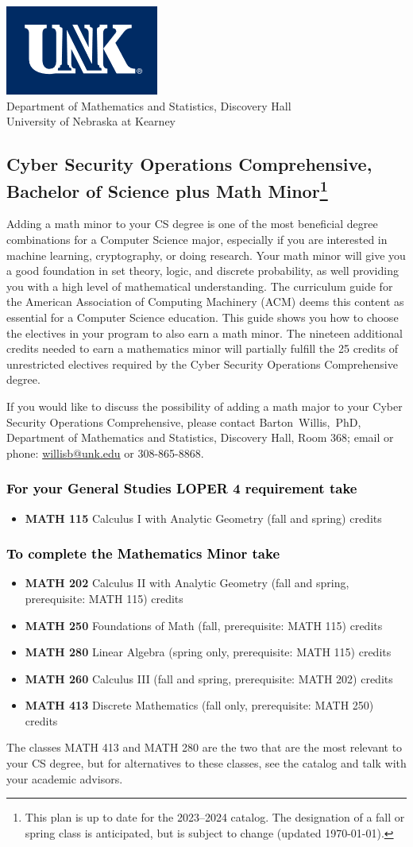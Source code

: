 \documentclass[10pt]{article}
\makeatletter
\newenvironment{mypar}[2]
   {\begin{list}{}%
     {\setlength\leftmargin{#1}
     \setlength\rightmargin{#2}}
     \item[]}
   {\end{list}}
\newcommand{\calcone}{\textbf{MATH 115} Calculus I with Analytic Geometry (fall and spring) \dotfill 5 credits}
\newcommand{\calctwo}{\textbf{MATH 202} Calculus II with Analytic Geometry (fall and spring, prerequisite: MATH 115) \dotfill 5 credits }
\newcommand{\foundations}{\textbf{MATH 250} Foundations of Math (fall, prerequisite: MATH 115)  \dotfill 3 credits}
\newcommand{\calcthree}{\textbf{MATH 260} Calculus III  (fall and spring, prerequisite: MATH 202) \dotfill 5 credits}
\newcommand{\linear}{\textbf{MATH 280} Linear Algebra (spring only, prerequisite: MATH 115) \dotfill 3 credits}
\newcommand{\linearshort}{MATH 280}
\newcommand{\discrete}{\textbf{MATH 413} Discrete Mathematics  (fall only, prerequisite: MATH 250)\dotfill 3 credits}
\newcommand{\discreteshort}{MATH 413}
\newcommand{\contactbw}{\mbox{Barton Willis, PhD}, Department of Mathematics and Statistics,  Discovery Hall, Room 368;
email or phone: \href{mailto:willisb@unk.edu}{willisb@unk.edu} or 308-865-8868.}
\newcommand{\forinfo}[2]{If you would like to discuss the possibility of adding a math {#1} to your {#2}, please contact \contactbw}
\newcommand{\catalog}{2023--2024 }
\newcommand{\LOPER}{LOPER\xspace}
\newcommand{\myfootnote}{\footnote{This plan is up to date for  the \catalog catalog. The designation of a fall or spring class is 
anticipated, but  is subject to change (updated \today).}}
\newcommand{\myheading}{
\begin{flushleft}
\includegraphics[scale=0.35]{unk-logo}\\
\setcounter{footnote}{0}
\vspace{0.25in}
 \textcolor{unkblue}{Department of Mathematics and Statistics, Discovery Hall} \\
  \textcolor{unkblue}{University of Nebraska at Kearney}
\end{flushleft}}
\makeatother
\begin{document}


\myheading

\subsection*{\textbf{\textcolor{unkblue}{Cyber Security Operations Comprehensive, Bachelor of Science plus Math Minor\myfootnote}}}

Adding a math minor to your CS degree is one of the most beneficial degree combinations 
for a Computer Science major, especially if you are interested in machine learning, 
cryptography,  or doing research.  Your math minor will give you a good foundation in 
set theory, logic, and discrete probability, as well providing you with a high level of 
mathematical understanding. The curriculum guide for the American Association of 
Computing Machinery (ACM) deems  this content  as essential for  a Computer Science 
education. This guide shows you how to choose the electives in your program to also 
earn a math minor. The nineteen additional credits needed to earn a mathematics minor 
will partially fulfill the 25 credits of unrestricted electives required by the 
Cyber Security Operations Comprehensive degree.

 
 \forinfo{major}{Cyber Security Operations Comprehensive}


\vspace{-0.1in}

\subsubsection*{\textcolor{black}{For  your General Studies \LOPER 4 requirement take}}
\begin{itemize}
\item  \calcone
\end{itemize}

\subsubsection*{\textcolor{black}{To complete the Mathematics Minor take}}

\begin{itemize}
\item \calctwo
\item \foundations
\item \linear
\item \calcthree
\item \discrete
\end{itemize}
\begin{mypar}{0.5cm}{0.5cm}{The classes \discreteshort{} and \linearshort{} are the two that are the most 
   relevant to your  CS degree, but for alternatives to these classes, see the catalog and talk with your academic advisors.} \end{mypar}
\end{document}
